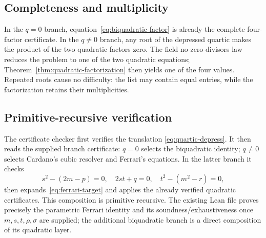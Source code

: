 \subsection{Completeness and multiplicity}

In the $q=0$ branch, equation~\eqref{eq:biquadratic-factor} is already the
complete four-factor certificate.  In the $q\ne0$ branch, any root of the
depressed quartic makes the product of the two quadratic factors zero.  The
field no-zero-divisors law reduces the problem to one of the two quadratic
equations; Theorem~\ref{thm:quadratic-factorization} then yields one of the
four values.  Repeated roots cause no difficulty: the list may contain equal
entries, while the factorization retains their multiplicities.

\subsection{Primitive-recursive verification}

The certificate checker first verifies the translation
\eqref{eq:quartic-depress}.  It then reads the supplied branch certificate:
$q=0$ selects the biquadratic identity; $q\ne0$ selects Cardano's cubic
resolver and Ferrari's equations.  In the latter branch it checks
\[
 s^2-(2m-p)=0,
 \quad 2st+q=0,
 \quad t^2-(m^2-r)=0,
\]
then expands~\eqref{eq:ferrari-target} and applies the already verified
quadratic certificates.  This composition is primitive recursive.  The
existing Lean file  proves precisely the parametric Ferrari
identity and its soundness/exhaustiveness once $m,s,t,\rho,\sigma$ are
supplied; the additional biquadratic branch is a direct composition of its
quadratic layer.
